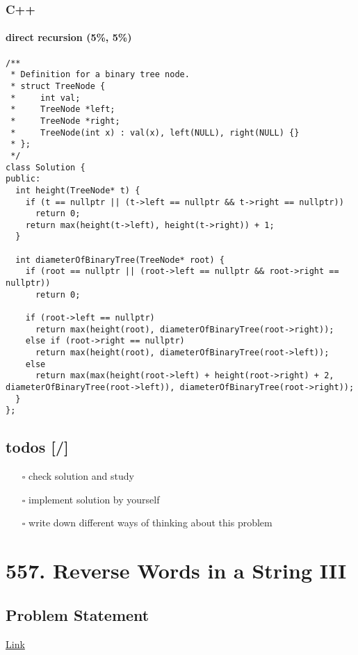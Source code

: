 \documentclass[12pt]{article}
\begin{document}
\subsubsection{C++}
\label{sec:orga095ac9}
\paragraph{direct recursion (5\%, 5\%)}
\label{sec:orgfb00bb3}
\begin{verbatim}
/**
 * Definition for a binary tree node.
 * struct TreeNode {
 *     int val;
 *     TreeNode *left;
 *     TreeNode *right;
 *     TreeNode(int x) : val(x), left(NULL), right(NULL) {}
 * };
 */
class Solution {
public:
  int height(TreeNode* t) {
    if (t == nullptr || (t->left == nullptr && t->right == nullptr))
      return 0; 
    return max(height(t->left), height(t->right)) + 1;
  }

  int diameterOfBinaryTree(TreeNode* root) {
    if (root == nullptr || (root->left == nullptr && root->right == nullptr))
      return 0;

    if (root->left == nullptr)
      return max(height(root), diameterOfBinaryTree(root->right));
    else if (root->right == nullptr)
      return max(height(root), diameterOfBinaryTree(root->left));
    else
      return max(max(height(root->left) + height(root->right) + 2, diameterOfBinaryTree(root->left)), diameterOfBinaryTree(root->right));
  }
};

\end{verbatim}

\subsection{todos [/]}
\label{sec:org5fcf1d0}
\begin{itemize}
\item[{$\square$}] check solution and study
\item[{$\square$}] implement solution by yourself
\item[{$\square$}] write down different ways of thinking about this problem
\end{itemize}
\section{557. Reverse Words in a String III}
\label{sec:orgcf92b48}
\subsection{Problem Statement}
\label{sec:orgb3160dc}
\href{https://leetcode.com/problems/reverse-words-in-a-string-iii/}{Link}
\end{document}
